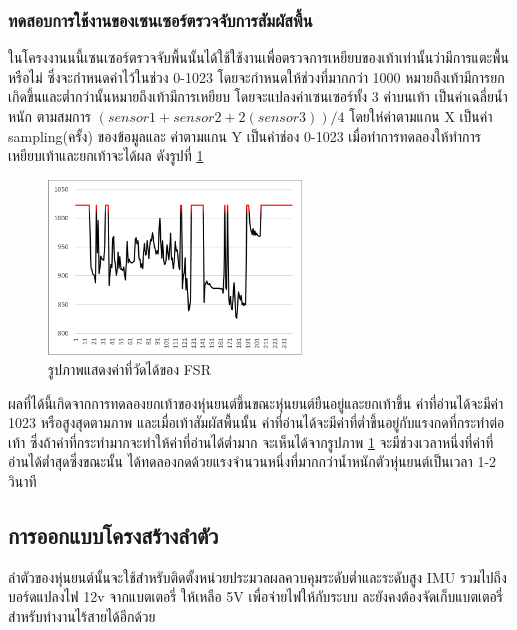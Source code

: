 \clearpage
\subsubsection{ทดสอบการใช้งานของเซนเซอร์ตรวจจับการสัมผัสพื้น}
ในโครงงานนนี้เซนเซอร์ตรวจจับพื้นนั้นได้ใช้ใช้งานเพื่อตรวจการเหยียบของเท้าเท่านั้นว่ามีการแตะพื้นหรือไม่ ซึ่งจะกำหนดค่าไว้ในช่วง 
0-1023 โดยจะกำหนดให้ช่วงที่มากกว่า 1000 หมายถึงเท้ามีการยกเกิดขึ้นและต่ำกว่านั้นหมายถึงเท้ามีการเหยียบ โดยจะแปลงค่าเซนเซอร์ทั้ง 3 ค่าบนเท้า
เป็นค่าเฉลี่ยน้ำหนัก ตามสมการ $(sensor1 + sensor 2 + 2(sensor3))/4$ โดยให่ค่าตามแกน X เป็นค่า sampling(ครั้ง) ของข้อมูลและ
ค่าตามแกน Y เป็นค่าช่อง 0-1023 เมื่อทำการทดลองให้ทำการเหยียบเท้าและยกเท้าจะได้ผล ดังรูปที่ \ref{fig:FSR_graph}

\begin{figure}[!ht]
  \centering
  \includegraphics[width=0.6\textwidth]{chapter4/images/FSR_graph.PNG}
  \caption{รูปภาพแสดงค่าที่วัดได้ของ FSR}
  \label{fig:FSR_graph}
\end{figure}
ผลที่ได้นี้เกิดจากการทดลองยกเท้าของหุ่นยนต์ขึ้นขณะหุ่นยนต์ยืนอยู่และยกเท้าขึ้น ค่าที่อ่านได้จะมีค่า 1023 หรือสูงสุดตามภาพ และเมื่อเท้าสัมผัสพื้นนั้น
ค่าที่อ่านได้จะมีค่าที่ต่ำขึ้นอยู่กับแรงกดที่กระทำต่อเท้า ซึ่งถ้าค่าที่กระทำมากจะทำให้ค่าที่อ่านได้ต่ำมาก จะเห็นได้จากรูปภาพ \ref{fig:FSR_graph} 
จะมีช่วงเวลาหนึ่งที่ค่าที่อ่านได้ต่ำสุดซึ่งขณะนั้น ได้ทดลองกดด้วยแรงจำนวนหนึ่งที่มากกว่าน้ำหนักตัวหุ่นยนต์เป็นเวลา 1-2 วินาที


\clearpage
\subsection{การออกแบบโครงสร้างลำตัว}
ลำตัวของหุ่นยนต์นั้นจะใช้สำหรับติดตั้งหน่วยประมวลผลควบคุมระดับต่ำและระดับสูง IMU รวมไปถึงบอร์ดแปลงไฟ 12v จากแบตเตอรี่
ให้เหลือ 5V เพื่อจ่ายไฟให้กับระบบ ละยังคงต้องจัดเก็บแบตเตอรี่สำหรับทำงานไร้สายได้อีกด้วย 
